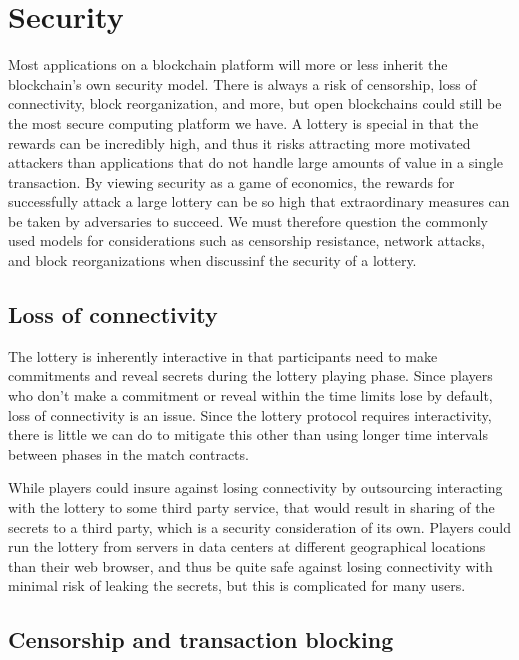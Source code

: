\section{Security}
\label{sec:security}

Most applications on a blockchain platform will more or less inherit the blockchain's own security model. There is always a risk of censorship, loss of connectivity, block reorganization, and more, but open blockchains could still be the most secure computing platform we have. A lottery is special in that the rewards can be incredibly high, and thus it risks attracting more motivated attackers than applications that do not handle large amounts of value in a single transaction. By viewing security as a game of economics, the rewards for successfully attack a large lottery can be so high that extraordinary measures can be taken by adversaries to succeed. We must therefore question the commonly used models for considerations such as censorship resistance, network attacks, and block reorganizations when discussinf the security of a lottery. 

\subsection{Loss of connectivity}
The lottery is inherently interactive in that participants need to make commitments and reveal secrets during the lottery playing phase. Since players who don't make a commitment or reveal within the time limits lose by default, loss of connectivity is an issue. Since the lottery protocol requires interactivity, there is little we can do to mitigate this other than using longer time intervals between phases in the match contracts. 

While players could insure against losing connectivity by outsourcing interacting with the lottery to some third party service, that would result in sharing of the secrets to a third party, which is a security consideration of its own. Players could run the lottery from servers in data centers at different geographical locations than their web browser, and thus be quite safe against losing connectivity with minimal risk of leaking the secrets, but this is complicated for many users. 

\subsection{Censorship and transaction blocking}
